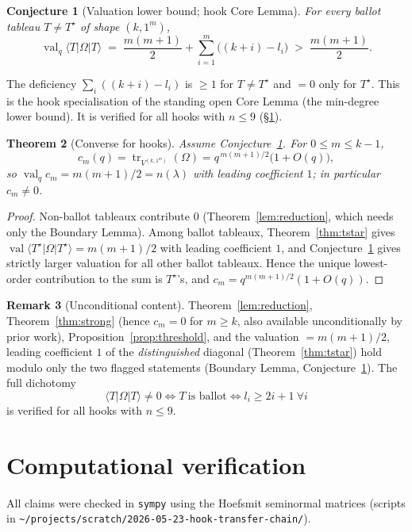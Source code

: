 \documentclass[11pt]{article}
\newtheorem{theorem}{Theorem}
\newtheorem{conjecture}[theorem]{Conjecture}
\theoremstyle{definition}
\newtheorem{remark}[theorem]{Remark}
\newcommand{\Om}{\Omega}
\newcommand{\la}{\lambda}
\DeclareMathOperator{\tr}{tr}
\DeclareMathOperator{\val}{val}
\begin{document}
\begin{conjecture}[Valuation lower bound; hook Core Lemma]\label{conj:lower}
For every ballot tableau $T\ne T^\star$ of shape $(k,1^m)$,
\[
  \val_q\langle T|\Om|T\rangle \;=\; \frac{m(m+1)}2+\sum_{i=1}^m\bigl((k+i)-l_i\bigr)\;>\;
  \frac{m(m+1)}2 .
\]
\end{conjecture}

\noindent The deficiency $\sum_i((k+i)-l_i)$ is $\ge 1$ for $T\ne T^\star$ and $=0$ only for
$T^\star$. This is the hook specialisation of the standing open Core Lemma (the min-degree lower
bound). It is verified for all hooks with $n\le 9$ (\S\ref{sec:verif}).

\begin{theorem}[Converse for hooks]\label{thm:converse}
Assume Conjecture~\ref{conj:lower}. For $0\le m\le k-1$,
\[
  c_m(q)=\tr_{V^{(k,1^m)}}(\Om)=q^{\,m(m+1)/2}\bigl(1+O(q)\bigr),
\]
so $\val_q c_m=m(m+1)/2=n(\la)$ with leading coefficient $1$; in particular $c_m\ne 0$.
\end{theorem}
\begin{proof}
Non-ballot tableaux contribute $0$ (Theorem~\ref{lem:reduction}, which needs only the Boundary
Lemma). Among ballot tableaux, Theorem~\ref{thm:tstar} gives
$\val\langle T^\star|\Om|T^\star\rangle=m(m+1)/2$ with leading coefficient $1$, and
Conjecture~\ref{conj:lower} gives strictly larger valuation for all other ballot tableaux.
Hence the unique lowest-order contribution to the sum is $T^\star$'s, and
$c_m=q^{m(m+1)/2}(1+O(q))$.
\end{proof}

\begin{remark}[Unconditional content]
Theorem~\ref{lem:reduction}, Theorem~\ref{thm:strong} (hence $c_m=0$ for $m\ge k$, also
available unconditionally by prior work), Proposition~\ref{prop:threshold}, and the valuation
$=m(m+1)/2$, leading coefficient $1$ of the \emph{distinguished} diagonal
(Theorem~\ref{thm:tstar}) hold modulo only the two flagged statements (Boundary Lemma,
Conjecture~\ref{conj:lower}). The full dichotomy
\[
  \langle T|\Om|T\rangle\ne 0 \iff T\ \text{is ballot}\iff l_i\ge 2i+1\ \forall i
\]
is verified for all hooks with $n\le 9$.
\end{remark}

\section{Computational verification}\label{sec:verif}

All claims were checked in \texttt{sympy} using the Hoefsmit seminormal matrices
(scripts in \texttt{\textasciitilde/projects/scratch/2026-05-23-hook-transfer-chain/}).
\end{document}
